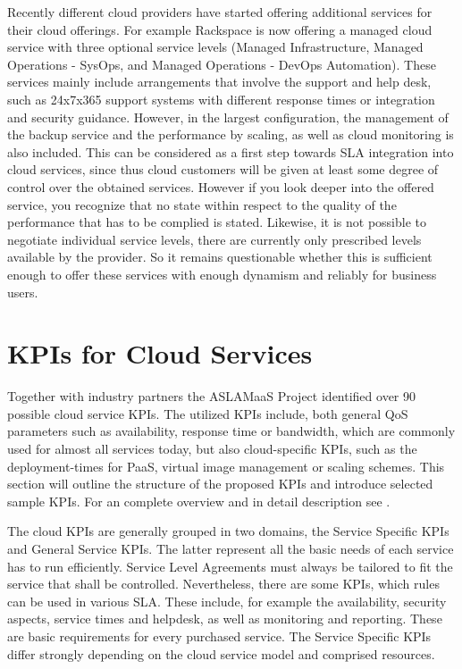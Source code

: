 Recently different cloud providers have started offering additional services for their cloud offerings. For example Rackspace \cite{rackspace15} is now offering a managed cloud service with three optional service levels (Managed Infrastructure, Managed Operations - SysOps, and Managed Operations - DevOps Automation). These services mainly include arrangements that involve the support and help desk, such as  24x7x365 support systems with different response times or integration and security guidance. However, in the largest configuration, the management of the backup service  and the performance by scaling, as well as cloud monitoring is also included. This can be considered as a first step towards SLA integration into cloud services, since thus cloud customers will be given at least some degree of control over the obtained services. However if you look deeper into the offered service, you recognize that no state within respect to the quality of the performance that has to be complied is stated. Likewise, it is not possible to negotiate individual service levels, there are currently only prescribed levels available by the provider. So it remains questionable whether this is sufficient enough to offer these services with enough dynamism and reliably for business users.




\section{KPIs for Cloud Services} \label{Cloud KPIs}
Together with industry partners the ASLAMaaS Project  \cite{ASLAMaaS} identified over 90 possible cloud service KPIs.  The utilized KPIs include, both general QoS parameters such as availability, response time or bandwidth, which are commonly used for almost all services today, but also cloud-specific KPIs, such as the deployment-times for PaaS, virtual image management or scaling schemes. This section will outline the structure of the proposed KPIs and introduce selected sample KPIs. For an complete overview and in detail description see  \cite{ASLAMaaSDoku}.

The cloud KPIs are generally grouped in two domains, the Service Specific KPIs and General Service KPIs. The latter represent all the basic needs of each service has to run efficiently. Service Level Agreements must always be tailored to fit the service that shall be controlled. Nevertheless, there are some KPIs, which rules can be used in various SLA.  These include, for example the availability, security aspects, service times and helpdesk, as well as monitoring and reporting. These are basic requirements for every purchased service. The Service Specific KPIs differ strongly depending on the cloud service model and comprised resources.

